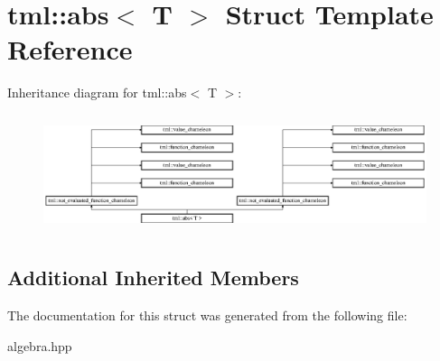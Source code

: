 \hypertarget{structtml_1_1abs}{\section{tml\+:\+:abs$<$ T $>$ Struct Template Reference}
\label{structtml_1_1abs}
}
Inheritance diagram for tml\+:\+:abs$<$ T $>$\+:\begin{figure}[H]
\begin{center}
\leavevmode
\includegraphics[height=3.500000cm]{structtml_1_1abs}
\end{center}
\end{figure}
\subsection*{Additional Inherited Members}


The documentation for this struct was generated from the following file\+:\begin{DoxyCompactItemize}
\item 
algebra.\+hpp\end{DoxyCompactItemize}
